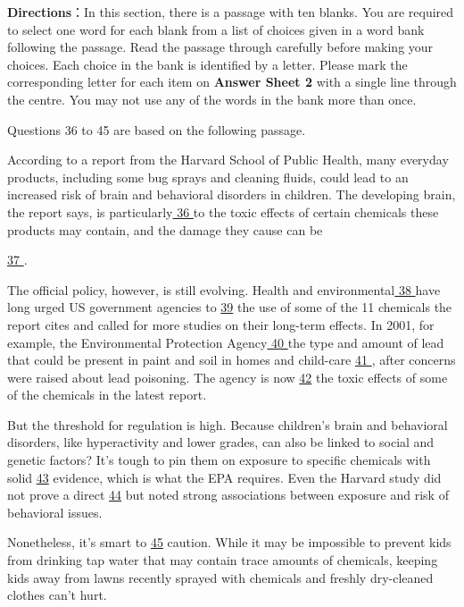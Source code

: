 \documentclass[UTF8,11pt]{ctexart}
\begin{document}
\textbf{Directions}：In this section, there is a passage with ten blanks. You are required to select one word for each blank from a list of choices given in a word bank following the passage. Read the passage through carefully before making your choices. Each choice in the bank is identified by a letter. Please mark the corresponding letter for each item on\textbf{ Answer Sheet 2} with a single line through the centre. You may not use any of the words in the bank more than once.


Questions 36 to 45 are based on the following passage.


According to a report from the Harvard School of Public Health, many everyday products, including some bug sprays and cleaning fluids, could lead to an increased risk of brain and behavioral disorders in children. The developing brain, the report says, is particularly\uline{ 36 }to the toxic effects of certain chemicals these products may contain, and the damage they cause can be


\uline{37 }.


The official policy, however, is still evolving. Health and environmental\uline{ 38 }have long urged US government agencies to \uline{39} the use of some of the 11 chemicals the report cites and called for more studies on their long-term effects. In 2001, for example, the Environmental Protection Agency\uline{ 40 }the type and amount of lead that could be present in paint and soil in homes and child-care \uline{41 }, after concerns were raised about lead poisoning. The agency is now \uline{42} the toxic effects of some of the chemicals in the latest report.


But the threshold for regulation is high. Because children’s brain and behavioral disorders, like hyperactivity and lower grades, can also be linked to social and genetic factors? It’s tough to pin them on exposure to specific chemicals with solid \uline{43} evidence, which is what the EPA requires. Even the Harvard study did not prove a direct \uline{44} but noted strong associations between exposure and risk of behavioral issues.


Nonetheless, it’s smart to \uline{45} caution. While it may be impossible to prevent kids from drinking tap water that may contain trace amounts of chemicals, keeping kids away from lawns recently sprayed with chemicals and freshly dry-cleaned clothes can’t hurt. 
\end{document}
